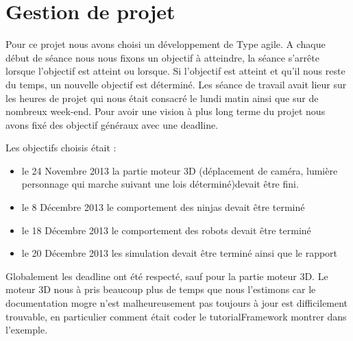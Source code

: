 \section{Gestion de projet}
\thispagestyle{fancy}
Pour ce projet nous avons choisi un développement de Type agile. A chaque début de séance nous nous fixons un objectif à atteindre, la séance s'arrête lorsque l'objectif est atteint ou lorsque. Si l'objectif est atteint et qu'il nous reste du temps, un nouvelle objectif est déterminé. Les séance de travail avait lieur sur les heures de projet qui nous était consacré le lundi matin ainsi que sur de nombreux week-end. Pour avoir une vision à plus long terme du projet nous avons fixé des objectif généraux avec une deadline. 

\noindent Les objectifs choisis était :
\begin{itemize}
\item le 24 Novembre 2013 la partie moteur 3D (déplacement de caméra, lumière personnage qui marche suivant une lois déterminé)devait être fini.
\item le 8 Décembre 2013 le comportement des ninjas devait être terminé
\item le 18 Décembre 2013 le comportement des robots devait être terminé
\item le 20 Décembre 2013 les simulation devait être terminé ainsi que le rapport
\end{itemize}

Globalement les deadline ont été respecté, sauf pour la partie moteur 3D. Le moteur 3D nous à pris beaucoup plus de temps que nous l'estimons car le documentation mogre n'est malheureusement pas toujours à jour est difficilement trouvable, en particulier comment était coder le tutorialFramework montrer dans l'exemple. 

  
